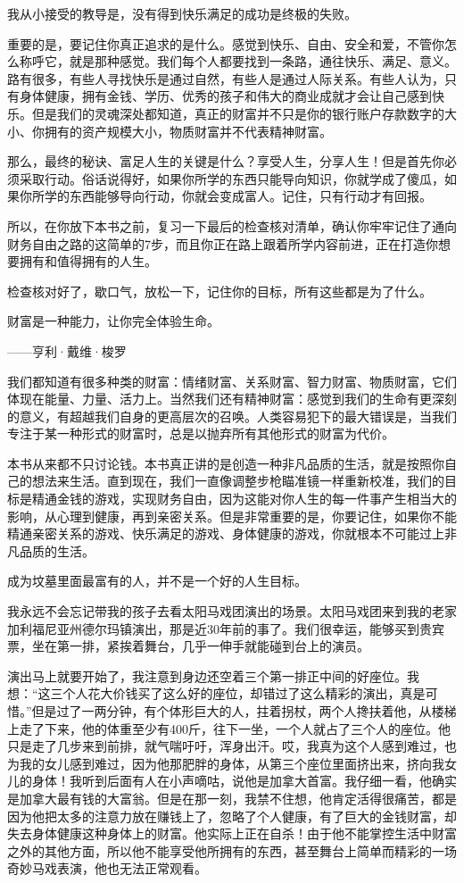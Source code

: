 我从小接受的教导是，没有得到快乐满足的成功是终极的失败。

重要的是，要记住你真正追求的是什么。感觉到快乐、自由、安全和爱，不管你怎么称呼它，就是那种感觉。我们每个人都要找到一条路，通往快乐、满足、意义。路有很多，有些人寻找快乐是通过自然，有些人是通过人际关系。有些人认为，只有身体健康，拥有金钱、学历、优秀的孩子和伟大的商业成就才会让自己感到快乐。但是我们的灵魂深处都知道，真正的财富并不只是你的银行账户存款数字的大小、你拥有的资产规模大小，物质财富并不代表精神财富。

那么，最终的秘诀、富足人生的关键是什么？享受人生，分享人生！但是首先你必须采取行动。俗话说得好，如果你所学的东西只能导向知识，你就学成了傻瓜，如果你所学的东西能够导向行动，你就会变成富人。记住，只有行动才有回报。

所以，在你放下本书之前，复习一下最后的检查核对清单，确认你牢牢记住了通向财务自由之路的这简单的7步，而且你正在路上跟着所学内容前进，正在打造你想要拥有和值得拥有的人生。

检查核对好了，歇口气，放松一下，记住你的目标，所有这些都是为了什么。

\begin{BookQuote}
财富是一种能力，让你完全体验生命。

\hfill ——亨利·戴维·梭罗
\end{BookQuote}

我们都知道有很多种类的财富：情绪财富、关系财富、智力财富、物质财富，它们体现在能量、力量、活力上。当然我们还有精神财富：感觉到我们的生命有更深刻的意义，有超越我们自身的更高层次的召唤。人类容易犯下的最大错误是，当我们专注于某一种形式的财富时，总是以抛弃所有其他形式的财富为代价。

本书从来都不只讨论钱。本书真正讲的是创造一种非凡品质的生活，就是按照你自己的想法来生活。直到现在，我们一直像调整步枪瞄准镜一样重新校准，我们的目标是精通金钱的游戏，实现财务自由，因为这能对你人生的每一件事产生相当大的影响，从心理到健康，再到亲密关系。但是非常重要的是，你要记住，如果你不能精通亲密关系的游戏、快乐满足的游戏、身体健康的游戏，你就根本不可能过上非凡品质的生活。

成为坟墓里面最富有的人，并不是一个好的人生目标。

我永远不会忘记带我的孩子去看太阳马戏团演出的场景。太阳马戏团来到我的老家加利福尼亚州德尔玛镇演出，那是近30年前的事了。我们很幸运，能够买到贵宾票，坐在第一排，紧挨着舞台，几乎一伸手就能碰到台上的演员。

演出马上就要开始了，我注意到身边还空着三个第一排正中间的好座位。我想：“这三个人花大价钱买了这么好的座位，却错过了这么精彩的演出，真是可惜。”但是过了一两分钟，有个体形巨大的人，拄着拐杖，两个人搀扶着他，从楼梯上走了下来，他的体重至少有400斤，往下一坐，一个人就占了三个人的座位。他只是走了几步来到前排，就气喘吁吁，浑身出汗。哎，我真为这个人感到难过，也为我的女儿感到难过，因为他那肥胖的身体，从第三个座位里面挤出来，挤向我女儿的身体！我听到后面有人在小声嘀咕，说他是加拿大首富。我仔细一看，他确实是加拿大最有钱的大富翁。但是在那一刻，我禁不住想，他肯定活得很痛苦，都是因为他把太多的注意力放在赚钱上了，忽略了个人健康，有了巨大的金钱财富，却失去身体健康这种身体上的财富。他实际上正在自杀！由于他不能掌控生活中财富之外的其他方面，所以他不能享受他所拥有的东西，甚至舞台上简单而精彩的一场奇妙马戏表演，他也无法正常观看。

